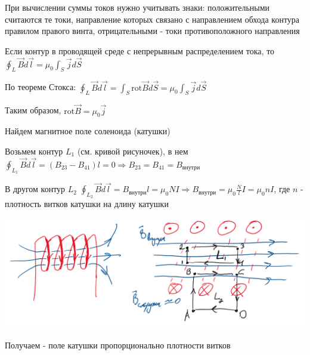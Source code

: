 \documentclass[12pt]{article}
\begin{document}
При вычислении суммы токов нужно учитывать знаки: положительными считаются те токи, направление которых связано с направлением обхода
контура правилом правого винта, отрицательными - токи противоположного направления

Если контур в проводящей среде с непрерывным распределением тока, то $\oint_L \vec{B} d\vec{l} = \mu_0 \int_S \vec{j} d\vec{S}$

По теореме Стокса: $\oint_L \vec{B} d\vec{l} = \int_S \mathrm{rot}\vec{B} d\vec{S} = \mu_0 \int_S \vec{j} d\vec{S}$

Таким образом, $\mathrm{rot}\vec{B} = \mu_0 \vec{j}$


\Ex Найдем магнитное поле соленоида (катушки)

Возьмем контур $L_1$ (см. кривой рисуночек), в нем $\oint_{L_1} \vec{B} d\vec{l} = (B_{23} - B_{41})l = 0 \Longrightarrow B_{23} = B_{41} = B_\text{внутри}$

В другом контур $L_2$ $\oint_{L_2} \vec{B} d\vec{l} = B_\text{внутри} l = \mu_0 NI \Longrightarrow B_\text{внутри} = \mu_0 \frac{N}{l} I = \mu_0 n I$, где $n$ - плотность витков катушки на длину катушки

\begin{center}
    \includegraphics[width=15cm]{physics2/images/physics2_2025_02_17_1}
\end{center}

Получаем  - поле катушки пропорционально плотности витков
\end{document}
